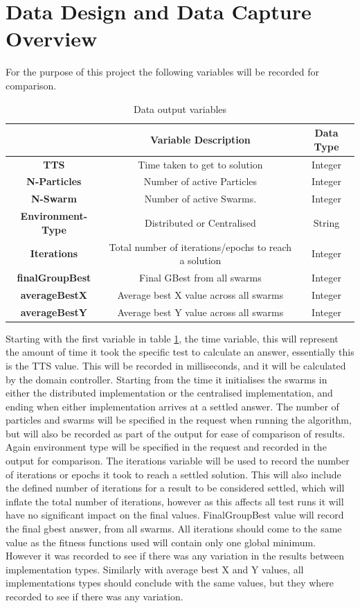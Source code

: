 \documentclass[oneside,12pt]{book}
\begin{document}
\section{Data Design and Data Capture Overview}
For the purpose of this project the following variables will be recorded for comparison. 
\begin{table}[H]
  \centering
    \begin{tabular}{| c | c | c |}
    \hline
     & \textbf{Variable Description} & \textbf{Data Type} \\ \hline
    \textbf{TTS} & Time taken to get to solution & Integer \\ \hline
    \textbf{N-Particles} & Number of active Particles  & Integer \\ \hline
    \textbf{N-Swarm} & Number of active Swarms. & Integer \\ \hline
    \textbf{Environment-Type} & Distributed or Centralised & String \\ \hline
    \textbf{Iterations} & Total number of iterations/epochs to reach a solution & Integer \\ \hline
    \textbf{finalGroupBest} & Final GBest from all swarms & Integer \\ \hline
    \textbf{averageBestX} & Average best X value across all swarms  & Integer \\ \hline
    \textbf{averageBestY} & Average best Y value across all swarms & Integer \\ \hline
    \end{tabular}
  \caption{Data output variables}
  \label{tab:data_output_design}
\end{table}
Starting with the first variable in table \ref{tab:data_output_design}, the time variable, this will represent the amount of time it took the specific test to calculate an answer, essentially this is the TTS value. This will be recorded in milliseconds, and it will be calculated by the domain controller. Starting from the time it initialises the swarms in either the distributed implementation or the centralised implementation, and ending when either implementation arrives at a settled answer. The number of particles and swarms will be specified in the request when running the algorithm, but will also be recorded as part of the output for ease of comparison of results. Again environment type will be specified in the request and recorded in the output for comparison. The iterations variable will be used to record the number of iterations or epochs it took to reach a settled solution. This will also include the defined number of iterations for a result to be considered settled, which will inflate the total number of iterations, however as this affects all test runs it will have no significant impact on the final values. FinalGroupBest value will record the final gbest answer, from all swarms. All iterations should come to the same value as the fitness functions used will contain only one global minimum. However it was recorded to see if there was any variation in the results between implementation types. Similarly with average best X and Y values, all implementations types should conclude with the same values, but they where recorded to see if there was any variation.
\end{document}
